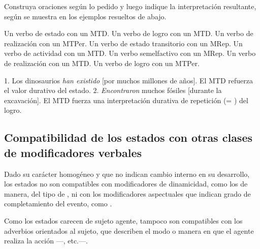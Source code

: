 \begin{ejercicio}\label{ej:08-construir}
Construya oraciones según lo pedido y luego indique la interpretación
resultante, según se muestra en los ejemplos resueltos de abajo.

\begin{exe}
  \ex Un verbo de estado con un MTD.
  \ex Un verbo de logro con un MTD.
  \ex Un verbo de realización con un MTPer.
  \ex Un verbo de estado transitorio con un MRep.
  \ex Un verbo de actividad con un MTD.
  \ex Un verbo semelfactivo con un MRep.
  \ex Un verbo de realización con un MTD.
  \ex Un verbo de logro con un MTPer.
\end{exe}

\begin{resuelto}
1. Los dinosaurios \textit{han existido} [por muchos millones de años]. El MTD
refuerza el valor durativo del estado. 2. \textit{Encontraron} muchos fósiles
[durante la excavación]. El MTD fuerza una interpretación durativa de repetición
(= ) del logro.
\end{resuelto}
\end{ejercicio}

\subsection{Compatibilidad de los estados con otras clases de modificadores verbales}\label{sec:08-estados}

Dado su carácter homogéneo y que no indican cambio interno en su desarrollo, los
estados no son compatibles con modificadores de dinamicidad, como los de
manera, del tipo de , ni con los
modificadores aspectuales que indican grado de completamiento del evento, como
.

\begin{exe}
\end{exe}

Como los estados carecen de sujeto agente, tampoco son compatibles con los
adverbios orientados al sujeto, que describen el modo o manera en que el agente
realiza la acción ---, etc.---.

\begin{exe}
\end{exe}

